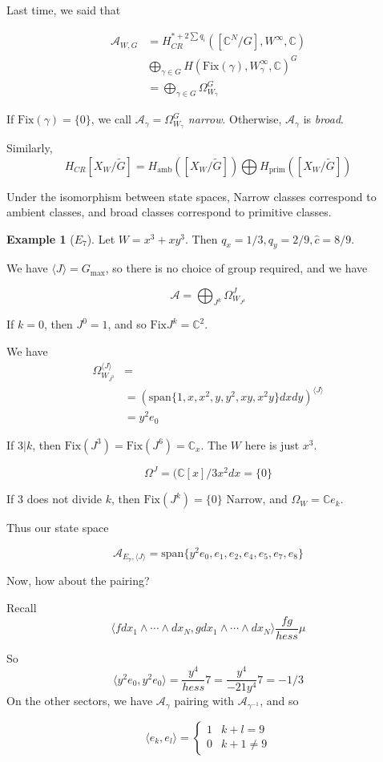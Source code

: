 \documentclass{amsart}
\theoremstyle{definition}
\newtheorem{example}[dummy]{Example}
\newcommand{\C}{\mathbb{C}}
\newcommand{\Fix}{\text{Fix}}
\begin{document}
Last time, we said that 

\begin{align*}
\mathcal{A}_{W,G}&=H_{CR}^{*+2\sum q_i}([\C^N/G],W^\infty,\C) \\
&\bigoplus_{\gamma\in G} H(\Fix(\gamma),W_\gamma^\infty,\C)^G \\
&=\bigoplus_{\gamma\in G} \Omega_{W_\gamma}^G
\end{align*}

If $\Fix(\gamma)=\{0\}$, we call $\mathcal{A}_\gamma=\Omega_{W_\gamma}^G$ \emph{narrow}.  Otherwise, $\mathcal{A}_\gamma$ is \emph{broad}.

Similarly, $$H_{CR}[X_W/\tilde{G}]=H_{\text{amb}}([X_W/\tilde{G}])\bigoplus H_{\text{prim}}([X_W/\tilde{G}])$$

Under the isomorphism between state spaces, Narrow classes correspond to ambient classes, and broad classes correspond to primitive classes.

\begin{example}[$E_7$]

Let $W=x^3+xy^3$.  Then $q_x=1/3, q_y=2/9, \hat{c}=8/9$.

We have $\langle J\rangle=G_{\max}$, so there is no choice of group required, and we have

$$\mathcal{A}=\bigoplus_{J^k}\Omega^J_{W_{J^k}}$$

If $k=0$, then $J^0=1$, and so $\Fix J^k=\C^2$.

We have 
\begin{align*}
\Omega^{\langle J\rangle}_{W_{J^0}} &= \\
&=(\text{span}\{1,x,x^2,y,y^2,xy,x^2y\}dxdy)^{\langle J\rangle}\\
&=y^2e_0
\end{align*}

If $3|k$, then $\Fix(J^3)=\Fix(J^6)=\C_x$.  The $W$ here is just $x^3$.  

$$\Omega^J = (\C[x]/3x^2dx
=\{0\}$$

If 3 does not divide $k$, then $\Fix(J^k)=\{0\}$ Narrow, and $\Omega_W=\C e_k$.

Thus our state space

$$\mathcal{A}_{E_7,\langle J\rangle}=\text{span}\{y^2e_0,e_1,e_2,e_4,e_5,e_7,e_8\}$$

Now, how about the pairing?

Recall 
$$\langle fdx_1\wedge\cdots\wedge dx_N,gdx_1\wedge\cdots\wedge dx_N\rangle
\frac{fg}{hess}\mu$$

So
$$\langle y^2e_0, y^2e_0\rangle=\frac{y^4}{hess}7=\frac{y^4}{-21y^4}7=-1/3$$
On the other sectors, we have $\mathcal{A}_\gamma$ pairing with $\mathcal{A}_{\gamma^{-1}}$, and so 

$$\langle e_k, e_l\rangle=\left\{\begin{array}{ll} 1 & k+l=9 \\ 0 & k+1\neq 9 
  \end{array}\right.$$

\end{example}
\end{document}
